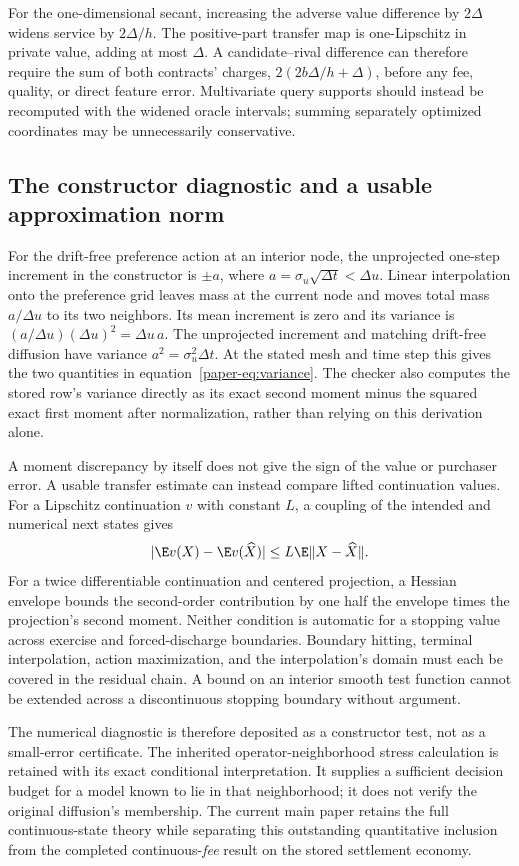 For the one-dimensional secant, increasing the adverse value difference by $2\Delta$ widens service by $2\Delta/h$. The positive-part transfer map is one-Lipschitz in private value, adding at most $\Delta$. A candidate--rival difference can therefore require the sum of both contracts' charges, $2(2b\Delta/h+\Delta)$, before any fee, quality, or direct feature error. Multivariate query supports should instead be recomputed with the widened oracle intervals; summing separately optimized coordinates may be unnecessarily conservative.

\subsection{The constructor diagnostic and a usable approximation norm}
For the drift-free preference action at an interior node, the unprojected one-step increment in the constructor is $\pm a$, where $a=\sigma_u\sqrt{\Delta t}<\Delta u$. Linear interpolation onto the preference grid leaves mass at the current node and moves total mass $a/\Delta u$ to its two neighbors. Its mean increment is zero and its variance is
$(a/\Delta u)(\Delta u)^2=\Delta u\,a$. The unprojected increment and matching drift-free diffusion have variance $a^2=\sigma_u^2\Delta t$. At the stated mesh and time step this gives the two quantities in equation~\eqref{paper-eq:variance}. The checker also computes the stored row's variance directly as its exact second moment minus the squared exact first moment after normalization, rather than relying on this derivation alone.

A moment discrepancy by itself does not give the sign of the value or purchaser error. A usable transfer estimate can instead compare lifted continuation values. For a Lipschitz continuation $v$ with constant $L$, a coupling of the intended and numerical next states gives
\[
 |\E v(X)-\E v(\widehat X)|\leq L\E\|X-\widehat X\|.
\]
For a twice differentiable continuation and centered projection, a Hessian envelope bounds the second-order contribution by one half the envelope times the projection's second moment. Neither condition is automatic for a stopping value across exercise and forced-discharge boundaries. Boundary hitting, terminal interpolation, action maximization, and the interpolation's domain must each be covered in the residual chain. A bound on an interior smooth test function cannot be extended across a discontinuous stopping boundary without argument.

The numerical diagnostic is therefore deposited as a constructor test, not as a small-error certificate. The inherited operator-neighborhood stress calculation is retained with its exact conditional interpretation. It supplies a sufficient decision budget for a model known to lie in that neighborhood; it does not verify the original diffusion's membership. The current main paper retains the full continuous-state theory while separating this outstanding quantitative inclusion from the completed continuous-\emph{fee} result on the stored settlement economy.

